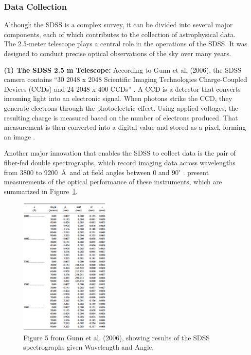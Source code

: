\documentclass[preprint,linenumbers, longauthor]{aastex631}
\begin{document}
\subsubsection{Data Collection}
Although the SDSS is a complex survey, it can be divided into several major components, each of which contributes to the collection of astrophysical data.
The 2.5-meter telescope plays a central role in the operations of the SDSS. It was designed to conduct precise optical observations of the sky over many years. 

\textbf{(1) The SDSS 2.5 m Telescope:}  
According to Gunn et al. (2006), the SDSS camera contains “30 2048 x 2048 Scientific Imaging Technologies Charge-Coupled Devices (CCDs) and 24 2048 x 400 CCDs” \cite{gunn25TelescopeSloan2006}. 
A CCD is a detector that converts incoming light into an electronic signal. 
When photons strike the CCD, they generate electrons through the photoelectric effect. 
Using applied voltages, the resulting charge is measured based on the number of electrons produced. 
That measurement is then converted into a digital value and stored as a pixel, forming an image \cite{lesserSummaryChargeCoupledDevices2015}.

Another major innovation that enables the SDSS to collect data is the pair of fiber-fed double spectrographs, which record imaging data across wavelengths from 3800 to 9200~\AA\ and at field angles between 0 and 90$^{\circ}$ \cite{gunn25TelescopeSloan2006}. 
present measurements of the optical performance of these instruments, which are summarized in Figure~\ref{fig:SDSS_Table}.

\begin{figure}[h!]
  \centering
  \includegraphics[width=0.4\textwidth]{gunn_table_5.png}
  \caption{Figure 5 from Gunn et al. (2006), showing results of the SDSS spectrographs given Wavelength and Angle.}
  \label{fig:SDSS_Table}
\end{figure}
\end{document}

